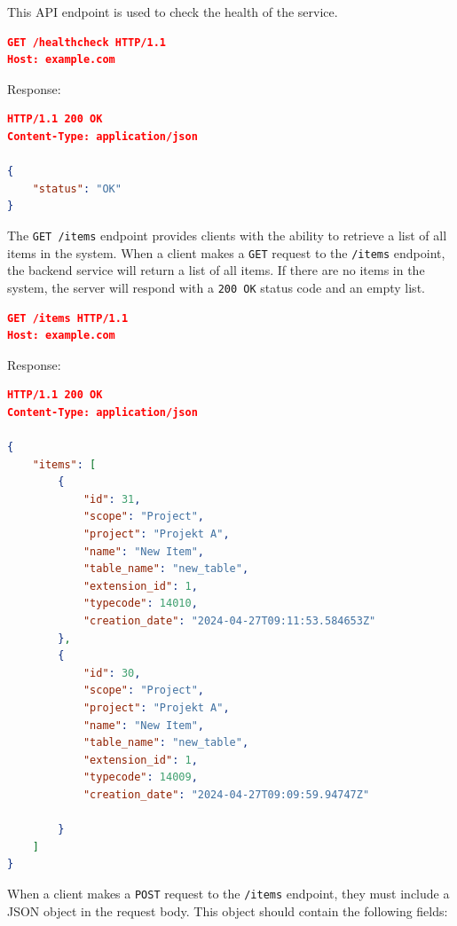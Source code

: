 
This API endpoint is used to check the health of the service.

\begin{lstlisting}[language=json,label={lst:lstlisting6}]
GET /healthcheck HTTP/1.1
Host: example.com
\end{lstlisting}

Response:

\begin{lstlisting}[language=json,label={lst:lstlisting4}]
HTTP/1.1 200 OK
Content-Type: application/json

{
    "status": "OK"
}
\end{lstlisting}


The \texttt{GET /items} endpoint provides clients with the ability to retrieve a list of all items in the system.
When a client makes a \texttt{GET} request to the \texttt{/items} endpoint, the backend service will return a list of all items.
If there are no items in the system, the server will respond with a \texttt{200 OK} status code and an empty list.

\begin{lstlisting}[language=json,label={lst:lstlisting3}]
GET /items HTTP/1.1
Host: example.com
\end{lstlisting}

Response:

\begin{lstlisting}[language=json,label={lst:lstlisting}]
HTTP/1.1 200 OK
Content-Type: application/json

{
    "items": [
        {
            "id": 31,
            "scope": "Project",
            "project": "Projekt A",
            "name": "New Item",
            "table_name": "new_table",
            "extension_id": 1,
            "typecode": 14010,
            "creation_date": "2024-04-27T09:11:53.584653Z"
        },
        {
            "id": 30,
            "scope": "Project",
            "project": "Projekt A",
            "name": "New Item",
            "table_name": "new_table",
            "extension_id": 1,
            "typecode": 14009,
            "creation_date": "2024-04-27T09:09:59.94747Z"

        }
    ]
}
\end{lstlisting}


When a client makes a \texttt{POST} request to the \texttt{/items} endpoint, they must include a JSON object in the request body.
This object should contain the following fields:

